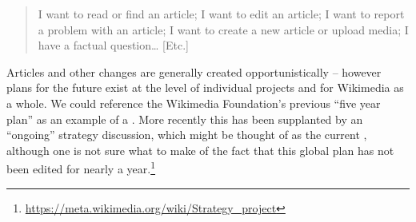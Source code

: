 \begin{quotation}
\noindent 
I want to read or find an article;
I want to edit an article;
I want to report a problem with an article;
I want to create a new article or upload media;
I have a factual question\ldots
[Etc.]
\end{quotation}
%
%
%
%
Articles and other changes are generally created opportunistically --
however plans for the future exist at the level of individual projects
and for Wikimedia as a whole.  We could reference the Wikimedia
Foundation's previous ``five year plan'' as an example of a
 \cite{wikimedia2011plan}.  More recently this
has been supplanted by an ``ongoing'' strategy discussion, which might
be thought of as the current , although one is
not sure what to make of the fact that this global plan has not been
edited for nearly a
year.\footnote{\url{https://meta.wikimedia.org/wiki/Strategy_project}}
%

